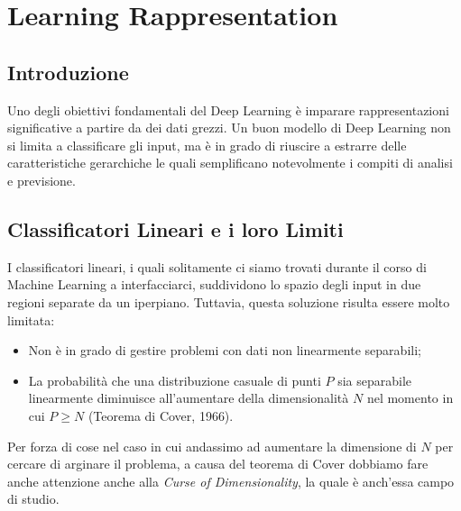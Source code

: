 \chapter{Learning Rappresentation}
\section{Introduzione}
Uno degli obiettivi fondamentali del Deep Learning è imparare rappresentazioni significative a partire da dei dati grezzi. Un buon modello di Deep Learning non si limita a classificare gli input, ma è in grado di riuscire a estrarre delle caratteristiche gerarchiche le quali semplificano notevolmente i compiti di analisi e previsione.

\section{Classificatori Lineari e i loro Limiti}
I classificatori lineari, i quali solitamente ci siamo trovati durante il corso di Machine Learning a interfacciarci, suddividono lo spazio degli input in due regioni separate da un iperpiano. Tuttavia, questa soluzione risulta essere molto limitata:
\begin{itemize}
    \item Non è in grado di gestire problemi con dati non linearmente separabili;
    \item La probabilità che una distribuzione casuale di punti $P$ sia separabile linearmente diminuisce all'aumentare della dimensionalità $N$ nel momento in cui $P \ge N$ (Teorema di Cover, 1966).
\end{itemize}

Per forza di cose nel caso in cui andassimo ad aumentare la dimensione di $N$ per cercare di arginare il problema, a causa del teorema di Cover dobbiamo fare anche attenzione anche alla \textit{Curse of Dimensionality}, la quale è anch'essa campo di studio.

